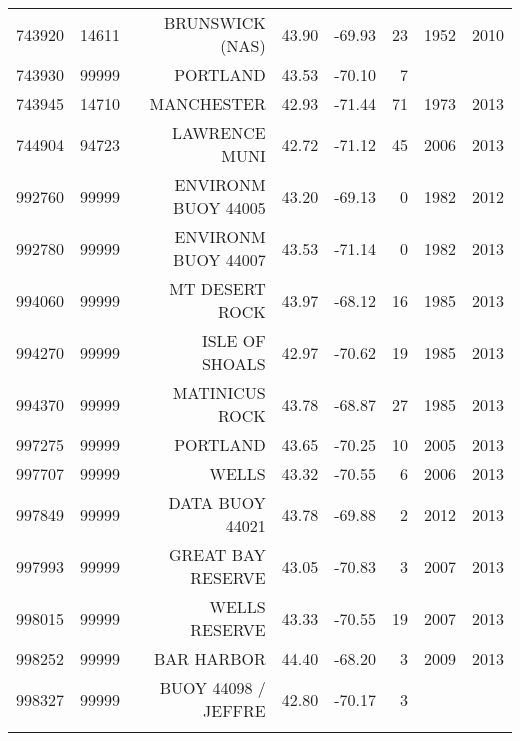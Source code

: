 \begin{longtable}{rrrrrrrr}
  743920 & 14611 & BRUNSWICK (NAS) & 43.90 & -69.93 & 23 & 1952 & 2010 \\ 
  743930 & 99999 & PORTLAND & 43.53 & -70.10 & 7 &  &  \\ 
  743945 & 14710 & MANCHESTER & 42.93 & -71.44 & 71 & 1973 & 2013 \\ 
  744904 & 94723 & LAWRENCE MUNI & 42.72 & -71.12 & 45 & 2006 & 2013 \\ 
  992760 & 99999 & ENVIRONM BUOY 44005 & 43.20 & -69.13 & 0 & 1982 & 2012 \\ 
  992780 & 99999 & ENVIRONM BUOY 44007 & 43.53 & -71.14 & 0 & 1982 & 2013 \\ 
  994060 & 99999 & MT DESERT ROCK & 43.97 & -68.12 & 16 & 1985 & 2013 \\ 
  994270 & 99999 & ISLE OF SHOALS & 42.97 & -70.62 & 19 & 1985 & 2013 \\ 
  994370 & 99999 & MATINICUS ROCK & 43.78 & -68.87 & 27 & 1985 & 2013 \\ 
  997275 & 99999 & PORTLAND & 43.65 & -70.25 & 10 & 2005 & 2013 \\ 
  997707 & 99999 & WELLS & 43.32 & -70.55 & 6 & 2006 & 2013 \\ 
  997849 & 99999 & DATA BUOY 44021 & 43.78 & -69.88 & 2 & 2012 & 2013 \\ 
  997993 & 99999 & GREAT BAY RESERVE & 43.05 & -70.83 & 3 & 2007 & 2013 \\ 
  998015 & 99999 & WELLS RESERVE & 43.33 & -70.55 & 19 & 2007 & 2013 \\ 
  998252 & 99999 & BAR HARBOR & 44.40 & -68.20 & 3 & 2009 & 2013 \\ 
  998327 & 99999 & BUOY 44098 / JEFFRE & 42.80 & -70.17 & 3 &  &  \\ 
   \bottomrule
\hline
\label{tab:US_Stations}
\end{longtable}
